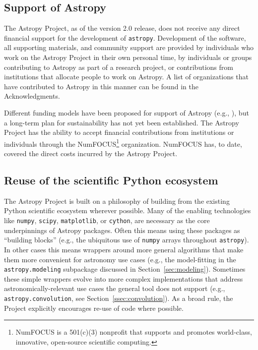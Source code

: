\documentclass[modern]{aastex62}
\newcommand{\package}[1]{\texttt{#1}\xspace}
\newcommand{\astropy}{Astropy\xspace}
\newcommand{\astropypkg}{\package{astropy}}
\newcommand{\sectionname}{Section\xspace}
\begin{document}
\subsection{Support of Astropy}

The \astropy Project, as of the version 2.0 release, does not receive any direct
financial support for the development of \astropypkg.
Development of the software, all supporting materials, and community support are
provided by individuals who work on the \astropy Project in their own personal
time, by individuals or groups contributing to \astropy as part of a research
project, or contributions from institutions that allocate people to work on
\astropy.
A list of organizations that have contributed to \astropy in this manner
can be found in the Acknowledgments.

Different funding models have been proposed for support of \astropy
(e.g., \citealt{2016arXiv161003159M}), but a long-term plan
for sustainability has not yet been established.
The \astropy Project has the ability to accept financial contributions
from institutions or individuals through the NumFOCUS\footnote{NumFOCUS
is a 501(c)(3) nonprofit that supports and promotes world-class, innovative,
open-source scientific computing.} organization. NumFOCUS has, 
to date, covered the direct costs incurred by the \astropy Project.

\subsection{Reuse of the scientific Python ecosystem}

The \astropy Project is built on a philosophy of building from the existing
Python scientific ecosystem wherever possible. Many of the enabling technologies
like \texttt{numpy}, \texttt{scipy}, \texttt{matplotlib}, or \texttt{cython},
are necessary as the core underpinnings of \astropy packages.  Often this means
using these packages as ``building blocks'' (e.g., the ubiquitous
use of \texttt{numpy} arrays throughout \astropypkg).  In other cases this means
wrappers around more general algorithms that make them more convenient for
astronomy use cases (e.g., the model-fitting in the \package{astropy.modeling}
subpackage discussed in \sectionname~\ref{sec:modeling}).  Sometimes these
simple wrappers evolve into more complex implementations that address
astronomically-relevant use cases the general tool does not support (e.g.,
\package{astropy.convolution}, see \sectionname~\ref{ssec:convolution}). As a
broad rule, the Project explicitly encourages re-use of code where possible.
\end{document}
